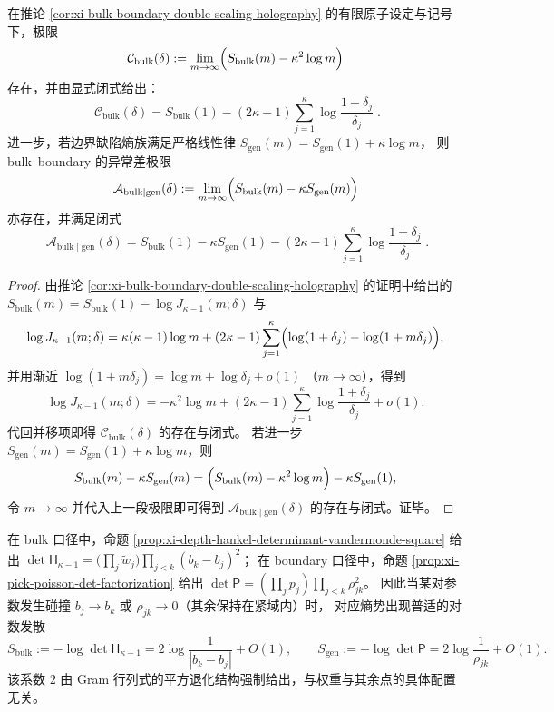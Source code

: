 \begin{theorem}\label{thm:xi-bulk-renormalized-constant-and-anomaly-gap}
在推论 \ref{cor:xi-bulk-boundary-double-scaling-holography} 的有限原子设定与记号下，极限
\[
\mathcal{C}_{\mathrm{bulk}}(\delta)
:=\lim_{m\to\infty}\Bigl(S_{\mathrm{bulk}}(m)-\kappa^2\log m\Bigr)
\]
存在，并由显式闭式给出：
\[
\boxed{\;
\mathcal{C}_{\mathrm{bulk}}(\delta)
=S_{\mathrm{bulk}}(1)-(2\kappa-1)\sum_{j=1}^{\kappa}\log\frac{1+\delta_j}{\delta_j}\; }.
\]
进一步，若边界缺陷熵族满足严格线性律
\(
S_{\mathrm{gen}}(m)=S_{\mathrm{gen}}(1)+\kappa\log m
\)，
则 bulk--boundary 的异常差极限
\[
\mathcal{A}_{\mathrm{bulk}\mid\mathrm{gen}}(\delta)
:=\lim_{m\to\infty}\Bigl(S_{\mathrm{bulk}}(m)-\kappa S_{\mathrm{gen}}(m)\Bigr)
\]
亦存在，并满足闭式
\[
\boxed{\;
\mathcal{A}_{\mathrm{bulk}\mid\mathrm{gen}}(\delta)
=S_{\mathrm{bulk}}(1)-\kappa S_{\mathrm{gen}}(1)-(2\kappa-1)\sum_{j=1}^{\kappa}\log\frac{1+\delta_j}{\delta_j}\; }.
\]
\end{theorem}
\begin{proof}
由推论 \ref{cor:xi-bulk-boundary-double-scaling-holography} 的证明中给出的
\(
S_{\mathrm{bulk}}(m)=S_{\mathrm{bulk}}(1)-\log J_{\kappa-1}(m;\delta)
\)
与
\[
\log J_{\kappa-1}(m;\delta)
=\kappa(\kappa-1)\log m
+(2\kappa-1)\sum_{j=1}^{\kappa}\Bigl(\log(1+\delta_j)-\log(1+m\delta_j)\Bigr),
\]
并用渐近
\(
\log(1+m\delta_j)=\log m+\log\delta_j+o(1)
\)
（\(m\to\infty\)），得到
\[
\log J_{\kappa-1}(m;\delta)
=-\kappa^2\log m+(2\kappa-1)\sum_{j=1}^{\kappa}\log\frac{1+\delta_j}{\delta_j}+o(1).
\]
代回并移项即得 \(\mathcal{C}_{\mathrm{bulk}}(\delta)\) 的存在与闭式。
若进一步 \(S_{\mathrm{gen}}(m)=S_{\mathrm{gen}}(1)+\kappa\log m\)，则
\[
S_{\mathrm{bulk}}(m)-\kappa S_{\mathrm{gen}}(m)
=\Bigl(S_{\mathrm{bulk}}(m)-\kappa^2\log m\Bigr)-\kappa S_{\mathrm{gen}}(1),
\]
令 \(m\to\infty\) 并代入上一段极限即可得到 \(\mathcal{A}_{\mathrm{bulk}\mid\mathrm{gen}}(\delta)\) 的存在与闭式。证毕。
\end{proof}

\begin{remark}\label{rem:xi-collision-universal-exponent-two}
在 bulk 口径中，命题 \ref{prop:xi-depth-hankel-determinant-vandermonde-square} 给出
\(
\det \mathsf H_{\kappa-1}
=\bigl(\prod_j\widetilde w_j\bigr)\prod_{j<k}(b_k-b_j)^2
\)；
在 boundary 口径中，命题 \ref{prop:xi-pick-poisson-det-factorization} 给出
\(
\det\mathsf P=(\prod_j p_j)\prod_{j<k}\rho_{jk}^2
\)。
因此当某对参数发生碰撞 \(b_j\to b_k\) 或 \(\rho_{jk}\to 0\)（其余保持在紧域内）时，
对应熵势出现普适的对数发散
\[
S_{\mathrm{bulk}}
:=-\log\det \mathsf H_{\kappa-1}
=2\log\frac{1}{|b_k-b_j|}+O(1),
\qquad
S_{\mathrm{gen}}
:=-\log\det\mathsf P
=2\log\frac{1}{\rho_{jk}}+O(1).
\]
该系数 \(2\) 由 Gram 行列式的平方退化结构强制给出，与权重与其余点的具体配置无关。
\end{remark}

